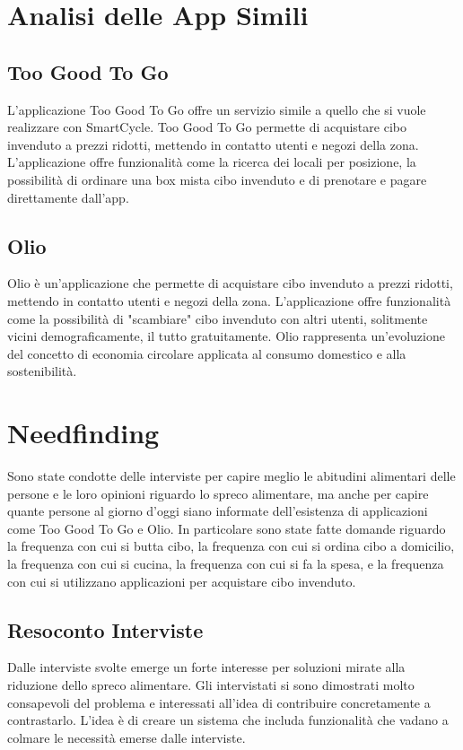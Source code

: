 \documentclass{article}
\begin{document}
\section{Analisi delle App Simili}
\subsection{Too Good To Go}
L'applicazione Too Good To Go offre un servizio simile a quello che si vuole realizzare con SmartCycle.
Too Good To Go permette di acquistare cibo invenduto a prezzi ridotti, mettendo in contatto utenti e negozi della zona.
L'applicazione offre funzionalità come la ricerca dei locali per posizione, la possibilità di ordinare una box mista cibo invenduto e di prenotare e pagare direttamente dall'app.

\subsection{Olio}
Olio è un'applicazione che permette di acquistare cibo invenduto a prezzi ridotti, mettendo in contatto utenti e negozi della zona.
L'applicazione offre funzionalità come la possibilità di "scambiare" cibo invenduto con altri utenti, solitmente vicini demograficamente, il tutto gratuitamente.
Olio rappresenta un’evoluzione del concetto di economia circolare applicata al consumo domestico e alla sostenibilità.

\section{Needfinding}
Sono state condotte delle interviste per capire meglio le abitudini alimentari delle persone e le loro opinioni riguardo lo spreco alimentare, ma anche per capire quante persone al giorno d'oggi siano informate dell'esistenza di applicazioni come Too Good To Go e Olio.
In particolare sono state fatte domande riguardo la frequenza con cui si butta cibo, la frequenza con cui si ordina cibo a domicilio, la frequenza con cui si cucina, la frequenza con cui si fa la spesa, e la frequenza con cui si utilizzano applicazioni per acquistare cibo invenduto.

\subsection{Resoconto Interviste}
Dalle interviste svolte emerge un forte interesse per soluzioni mirate alla riduzione dello spreco alimentare. 
Gli intervistati si sono dimostrati molto consapevoli del problema e interessati all’idea di contribuire concretamente a contrastarlo.
\newline
L'idea è di creare un sistema che includa funzionalità che vadano a colmare le necessità emerse dalle interviste.
\end{document}
